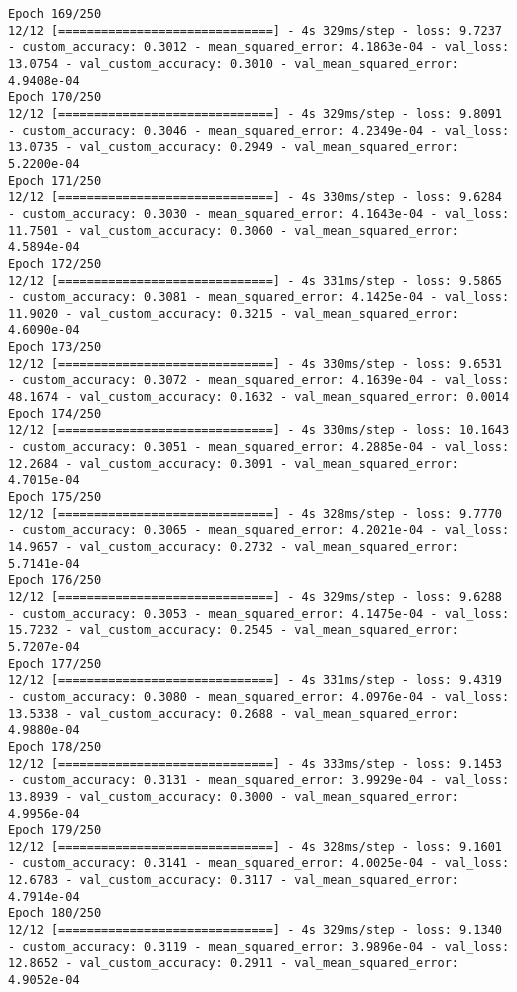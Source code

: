 \begin{lstlisting}
Epoch 169/250
12/12 [==============================] - 4s 329ms/step - loss: 9.7237 - custom_accuracy: 0.3012 - mean_squared_error: 4.1863e-04 - val_loss: 13.0754 - val_custom_accuracy: 0.3010 - val_mean_squared_error: 4.9408e-04
Epoch 170/250
12/12 [==============================] - 4s 329ms/step - loss: 9.8091 - custom_accuracy: 0.3046 - mean_squared_error: 4.2349e-04 - val_loss: 13.0735 - val_custom_accuracy: 0.2949 - val_mean_squared_error: 5.2200e-04
Epoch 171/250
12/12 [==============================] - 4s 330ms/step - loss: 9.6284 - custom_accuracy: 0.3030 - mean_squared_error: 4.1643e-04 - val_loss: 11.7501 - val_custom_accuracy: 0.3060 - val_mean_squared_error: 4.5894e-04
Epoch 172/250
12/12 [==============================] - 4s 331ms/step - loss: 9.5865 - custom_accuracy: 0.3081 - mean_squared_error: 4.1425e-04 - val_loss: 11.9020 - val_custom_accuracy: 0.3215 - val_mean_squared_error: 4.6090e-04
Epoch 173/250
12/12 [==============================] - 4s 330ms/step - loss: 9.6531 - custom_accuracy: 0.3072 - mean_squared_error: 4.1639e-04 - val_loss: 48.1674 - val_custom_accuracy: 0.1632 - val_mean_squared_error: 0.0014
Epoch 174/250
12/12 [==============================] - 4s 330ms/step - loss: 10.1643 - custom_accuracy: 0.3051 - mean_squared_error: 4.2885e-04 - val_loss: 12.2684 - val_custom_accuracy: 0.3091 - val_mean_squared_error: 4.7015e-04
Epoch 175/250
12/12 [==============================] - 4s 328ms/step - loss: 9.7770 - custom_accuracy: 0.3065 - mean_squared_error: 4.2021e-04 - val_loss: 14.9657 - val_custom_accuracy: 0.2732 - val_mean_squared_error: 5.7141e-04
Epoch 176/250
12/12 [==============================] - 4s 329ms/step - loss: 9.6288 - custom_accuracy: 0.3053 - mean_squared_error: 4.1475e-04 - val_loss: 15.7232 - val_custom_accuracy: 0.2545 - val_mean_squared_error: 5.7207e-04
Epoch 177/250
12/12 [==============================] - 4s 331ms/step - loss: 9.4319 - custom_accuracy: 0.3080 - mean_squared_error: 4.0976e-04 - val_loss: 13.5338 - val_custom_accuracy: 0.2688 - val_mean_squared_error: 4.9880e-04
Epoch 178/250
12/12 [==============================] - 4s 333ms/step - loss: 9.1453 - custom_accuracy: 0.3131 - mean_squared_error: 3.9929e-04 - val_loss: 13.8939 - val_custom_accuracy: 0.3000 - val_mean_squared_error: 4.9956e-04
Epoch 179/250
12/12 [==============================] - 4s 328ms/step - loss: 9.1601 - custom_accuracy: 0.3141 - mean_squared_error: 4.0025e-04 - val_loss: 12.6783 - val_custom_accuracy: 0.3117 - val_mean_squared_error: 4.7914e-04
Epoch 180/250
12/12 [==============================] - 4s 329ms/step - loss: 9.1340 - custom_accuracy: 0.3119 - mean_squared_error: 3.9896e-04 - val_loss: 12.8652 - val_custom_accuracy: 0.2911 - val_mean_squared_error: 4.9052e-04

\end{lstlisting}
